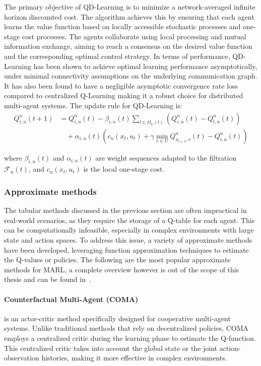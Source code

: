 The primary objective of QD-Learning is to minimize a network-averaged infinite horizon discounted cost. 
%
The algorithm achieves this by ensuring 
 that each agent learns the value function based on locally 
 accessible stochastic processes and one-stage cost processes. 
%
The agents collaborate using local processing and mutual information exchange, 
 aiming to reach a consensus on the desired value function and the corresponding optimal control strategy.
%
In terms of performance, 
 QD-Learning has been shown to achieve optimal learning performance asymptotically, 
 under minimal connectivity assumptions on the underlying communication graph. 
%
It has also been found to have a negligible asymptotic
 convergence rate loss compared to centralized Q-Learning
 making it a robust choice for distributed multi-agent systems.
The update rule for QD-Learning is:
 \begin{align*}
  Q^n_{i,u}(t+1) &= Q^n_{i,u}(t) - \beta_{i,u}(t) \sum_{l \in \Omega_n(t)} (Q^n_{i,u}(t) - Q^n_{l,u}(t)) \\
  &\quad + \alpha_{i,u}(t) \left( c_n(x_t, u_t) + \gamma \min_{v \in U} Q^n_{x_{t+1},v}(t) - Q^n_{i,u}(t) \right)
  \end{align*}
 
 where \(\beta_{i,u}(t)\) and \(\alpha_{i,u}(t)\) are weight sequences adapted to the filtration \(\mathcal{F}_{n}(t)\), and \(c_{n}(x_{t}, u_{t})\) is the local one-stage cost.

\subsubsection{Approximate methods}
The tabular methods discussed in the previous section are often impractical in real-world scenarios, 
 as they require the storage of a Q-table for each agent. 
 This can be computationally infeasible, 
 especially in complex environments with large state and action spaces.
%
To address this issue, 
 a variety of approximate methods have been developed, 
 leveraging function approximation techniques to estimate the Q-values or policies.
%
The following are the most popular approximate methods for MARL, a complete overview however is out of the scope of this thesis and can be found in~\cite{DBLP:journals/corr/abs-1908-03963}. 
\paragraph*{Counterfactual Multi-Agent (COMA)~\cite{DBLP:journals/corr/FoersterFANW17}}
 is an actor-critic method specifically designed for cooperative multi-agent systems.
 Unlike traditional methods that rely on decentralized policies,
 COMA employs a centralized critic during the learning phase to estimate the Q-function. 
 This centralized critic takes into account the global state or the joint action-observation histories, 
 making it more effective in complex environments.

